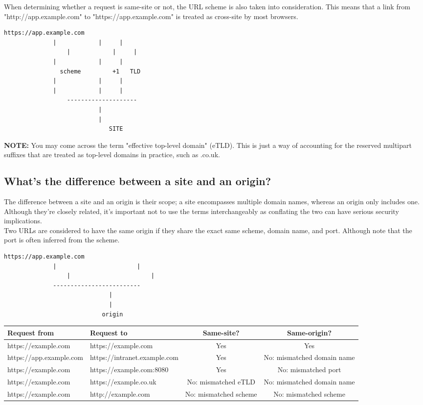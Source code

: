 \documentclass{article}
\begin{document}
When determining whether a request is same-site or not, the URL scheme is also taken into consideration. This means that a link from "http://app.example.com" to "https://app.example.com" is treated as cross-site by most browsers. 


\begin{lstlisting}[frame=single]
			https://app.example.com
			  |            |     |
    			  |            |     |
			  |            |     |
		        scheme         +1   TLD
			  |            |     |
			  |            |     |
		          --------------------
		                   |
		                   |
	     	                  SITE
\end{lstlisting}


\textbf{NOTE:} You may come across the term "effective top-level domain" (eTLD). This is just a way of accounting for the reserved multipart suffixes that are treated as top-level domains in practice, such as .co.uk.

\subsection*{What's the difference between a site and an origin?}
 The difference between a site and an origin is their scope; a site encompasses multiple domain names, whereas an origin only includes one. Although they're closely related, it's important not to use the terms interchangeably as conflating the two can have serious security implications.\\

Two URLs are considered to have the same origin if they share the exact same scheme, domain name, and port. Although note that the port is often inferred from the scheme. 
\begin{lstlisting}[frame=single]
			   https://app.example.com
		 	  |                       |
		    	  |                       |
		  	  -------------------------
		              	      |
		               	      |
	     	        	    origin  
\end{lstlisting}

\begin{table}[h]
\centering
\begin{tabular}{>{\ttfamily}l>{\ttfamily}lcc}
\toprule
\textrm{Request from} & \textrm{Request to} & \textrm{Same-site?} & \textrm{Same-origin?} \\
\midrule
https://example.com & https://example.com & Yes & Yes \\
https://app.example.com & https://intranet.example.com & Yes & No: mismatched domain name \\
https://example.com & https://example.com:8080 & Yes & No: mismatched port \\
https://example.com & https://example.co.uk & No: mismatched eTLD & No: mismatched domain name \\
https://example.com & http://example.com & No: mismatched scheme & No: mismatched scheme \\
\bottomrule
\end{tabular}
\label{tab:same-site-origin}
\end{table}
\end{document}
